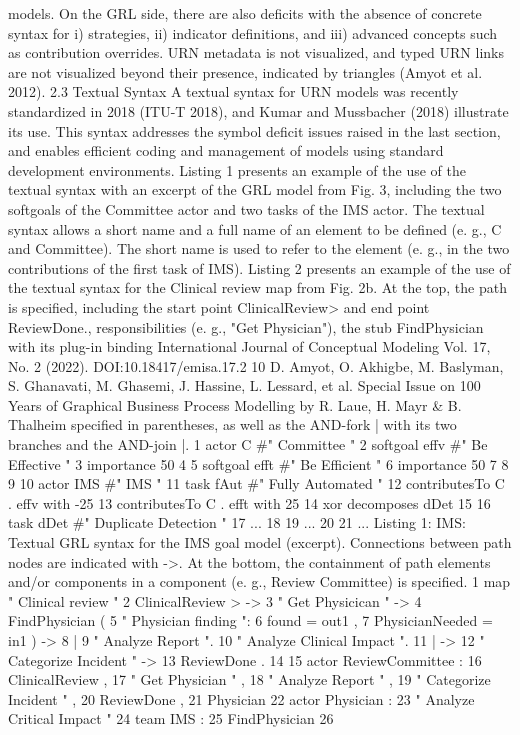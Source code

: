 models. On the GRL side, there are also deficits
with the absence of concrete syntax for i) strategies,
ii) indicator definitions, and iii) advanced concepts
such as contribution overrides. URN metadata
is not visualized, and typed URN links are not
visualized beyond their presence, indicated by
triangles (Amyot et al. 2012).
2.3 Textual Syntax
A textual syntax for URN models was recently
standardized in 2018 (ITU-T 2018), and Kumar
and Mussbacher (2018) illustrate its use. This
syntax addresses the symbol deficit issues raised
in the last section, and enables efficient coding
and management of models using standard development environments.
Listing 1 presents an example of the use of the
textual syntax with an excerpt of the GRL model
from Fig. 3, including the two softgoals of the
Committee actor and two tasks of the IMS actor.
The textual syntax allows a short name and a full
name of an element to be defined (e. g., C and
Committee). The short name is used to refer to the
element (e. g., in the two contributions of the first
task of IMS).
Listing 2 presents an example of the use of
the textual syntax for the Clinical review map from
Fig. 2b. At the top, the path is specified, including
the start point ClinicalReview> and end point ReviewDone., responsibilities (e. g., "Get Physician"),
the stub FindPhysician with its plug-in binding
International Journal of Conceptual Modeling
Vol. 17, No. 2 (2022). DOI:10.18417/emisa.17.2
10 D. Amyot, O. Akhigbe, M. Baslyman, S. Ghanavati, M. Ghasemi, J. Hassine, L. Lessard, et al.
Special Issue on 100 Years of Graphical Business Process Modelling by R. Laue, H. Mayr & B. Thalheim
specified in parentheses, as well as the AND-fork
{| with its two branches and the AND-join |}.
1 actor C #" Committee " {
2 softgoal effv #" Be Effective " {
3 importance 50
4 }
5 softgoal efft #" Be Efficient " {
6 importance 50
7 }
8 }
9
10 actor IMS #" IMS " {
11 task fAut #" Fully Automated " {
12 contributesTo C . effv with -25
13 contributesTo C . efft with 25
14 xor decomposes dDet
15 }
16 task dDet #" Duplicate Detection " {
17 ...
18 }
19 ...
20 }
21 ...
Listing 1: IMS: Textual GRL syntax for the IMS goal
model (excerpt).
Connections between path nodes are indicated
with ->. At the bottom, the containment of path
elements and/or components in a component (e. g.,
Review Committee) is specified.
1 map " Clinical review " {
2 ClinicalReview > ->
3 " Get Physicican " ->
4 FindPhysician (
5 " Physician finding ":
6 found = out1 ,
7 PhysicianNeeded = in1 ) ->
8 {|
9 " Analyze Report ".
10 " Analyze Clinical Impact ".
11 |} ->
12 " Categorize Incident " ->
13 ReviewDone .
14
15 actor ReviewCommittee :
16 ClinicalReview ,
17 " Get Physician " ,
18 " Analyze Report " ,
19 " Categorize Incident " ,
20 ReviewDone ,
21 Physician
22 actor Physician :
23 " Analyze Critical Impact "
24 team IMS :
25 FindPhysician
26 }
